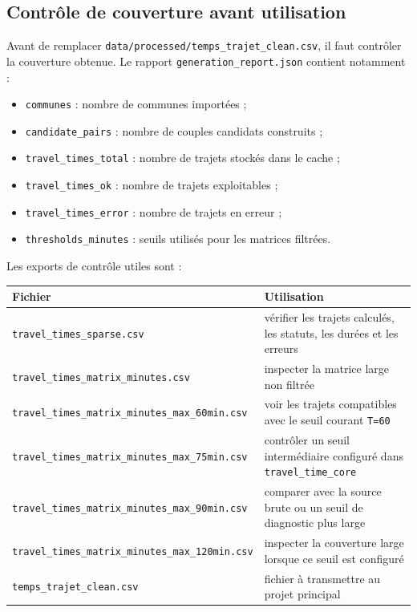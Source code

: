 \documentclass[11pt,a4paper]{article}
\begin{document}
\subsection{Contrôle de couverture avant utilisation}

Avant de remplacer \texttt{data/processed/temps\_trajet\_clean.csv}, il faut
contrôler la couverture obtenue. Le rapport
\texttt{generation\_report.json} contient notamment :

\begin{itemize}
\item \texttt{communes} : nombre de communes importées ;
\item \texttt{candidate\_pairs} : nombre de couples candidats construits ;
\item \texttt{travel\_times\_total} : nombre de trajets stockés dans le cache ;
\item \texttt{travel\_times\_ok} : nombre de trajets exploitables ;
\item \texttt{travel\_times\_error} : nombre de trajets en erreur ;
\item \texttt{thresholds\_minutes} : seuils utilisés pour les matrices filtrées.
\end{itemize}

Les exports de contrôle utiles sont :

\begin{longtable}{|L{0.55\textwidth}|L{0.45\textwidth}|}
\hline
Fichier & Utilisation \\
\hline
\endhead
\texttt{travel\_times\_sparse.csv} & vérifier les trajets calculés, les statuts, les durées et les erreurs \\
\hline
\texttt{travel\_times\_matrix\_minutes.csv} & inspecter la matrice large non filtrée \\
\hline
\texttt{travel\_times\_matrix\_minutes\_max\_60min.csv} & voir les trajets compatibles avec le seuil courant \texttt{T=60} \\
\hline
\texttt{travel\_times\_matrix\_minutes\_max\_75min.csv} & contrôler un seuil intermédiaire configuré dans \texttt{travel\_time\_core} \\
\hline
\texttt{travel\_times\_matrix\_minutes\_max\_90min.csv} & comparer avec la source brute ou un seuil de diagnostic plus large \\
\hline
\texttt{travel\_times\_matrix\_minutes\_max\_120min.csv} & inspecter la couverture large lorsque ce seuil est configuré \\
\hline
\texttt{temps\_trajet\_clean.csv} & fichier à transmettre au projet principal \\
\hline
\end{longtable}
\end{document}
